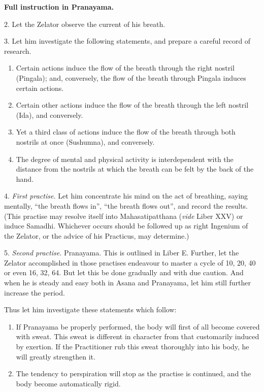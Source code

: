 

\textbf{Full instruction in Pranayama.} 

2. Let the Zelator observe the current of his breath.

3. Let him investigate the following statements, and prepare a careful record of research.

\begin{enumerate}[label=(\textit{\alph*})]
\item Certain actions induce the flow of the breath through the right nostril (Pingala); and, conversely, the flow of the breath through Pingala induces certain actions.
\item Certain other actions induce the flow of the breath through the left nostril (Ida), and conversely.
\item Yet a third class of actions induce the flow of the breath through both nostrils at once (Sushumna), and conversely.
\item The degree of mental and physical activity is interdependent with the distance from the nostrils at which the breath can be felt by the back of the hand.
\end{enumerate}

4. \textit{First practise.} Let him concentrate his mind on the act of breathing, saying mentally, \enquote{the breath flows in}, \enquote{the breath flows out}, and record the results. (This practise may resolve itself into Mahasatipatthana (\textit{vide} Liber XXV) or induce Samadhi. Whichever occurs should be followed up as right Ingenium of the Zelator, or the advice of his Practicus, may determine.)

5. \textit{Second practise.} Pranayama. This is outlined in Liber E. Further, let the Zelator accomplished in those practises endeavour to master a cycle of 10, 20, 40 or even 16, 32, 64. But let this be done gradually and with due caution. And when he is steady and easy both in Asana and Pranayama, let him still further increase the period.

Thus let him investigate these statements which follow:
\begin{enumerate}[label=(\textit{\alph*})]
\item If Pranayama be properly performed, the body will first of all become covered with sweat. This sweat is different in character from that customarily induced by exertion. If the Practitioner rub this sweat thoroughly into his body, he will greatly strengthen it.
\item The tendency to perspiration will stop as the practise is continued, and the body become automatically rigid.
\end{enumerate}

